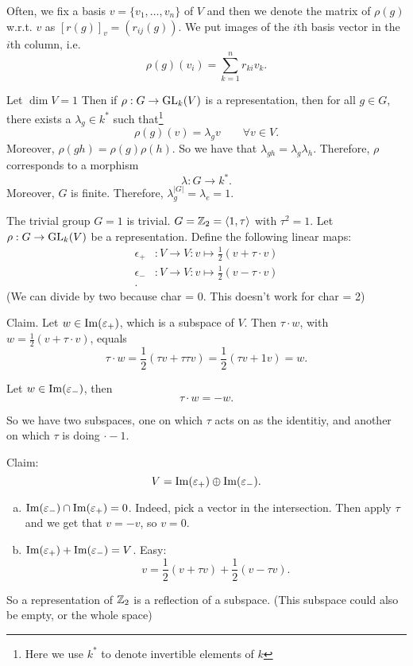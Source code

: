 Often, we fix a basis $ v = \{v_1, \ldots, v_n\}$ of $V $ and then we denote the matrix of $\rho(g)$ w.r.t. $v$ as $[r(g)]_v = (r_{ij}(g))$.
We put images of the $i$th basis vector in the $i$th column, i.e.
\[
    \rho(g)(v_i) = \sum_{k=1}^{n} r_{ki} v_k
.\] 

\begin{eg}
    Let $\dim V = 1$
    Then if $\rho: G\to \operatorname{GL}_k(V)$ is a representation, then for all $g \in G$, there exists a $\lambda_g \in k^{*}$ such that\footnote{Here we use $k^{*}$ to denote invertible elements of $k$}
    \[
        \rho(g)(v) = \lambda_g v \qquad \forall  v \in V
    .\] 
    Moreover, $\rho(gh) = \rho(g) \rho(h)$.
    So we have that  $\lambda_{gh} = \lambda_g \lambda_h.$
    Therefore, $\rho$ corresponds to a morphism
    \[
    \lambda: G \to  k^{*}
    .\] 
    Moreover, $G$ is finite. Therefore, $\lambda_g^{|G|} = \lambda_e = 1$.
\end{eg}

\begin{eg}
    The trivial group $G = 1$ is trivial.
    $G = \mathbb{Z}_2 = \left<1, \tau \right>$ with $\tau^2 = 1$.
    Let $\rho: G \to  \operatorname{GL}_k(V)$ be a representation.
    Define the following linear maps:
    \begin{align*}
        \epsilon_+&: V \to  V : v \mapsto  \frac{1}{2} (v + \tau\cdot v)\\
        \epsilon_-&: V \to  V : v \mapsto  \frac{1}{2} (v - \tau\cdot v)\\
    .\end{align*} 
    (We can divide by two because char = 0. This doesn't work for char = 2)

    Claim. Let $w \in  \operatorname{Im} (\varepsilon_+)$, which is a subspace of $V$.
    Then $\tau\cdot w$, with $w = \frac{1}{2}(v + \tau\cdot v)$, equals 
    \[
        \tau\cdot w = \frac{1}{2}(\tau v + \tau \tau v) = 
        \frac{1}{2}(\tau v + 1 v)  = w
    .\] 

    Let $w \in  \operatorname{Im} (\varepsilon_-)$, then
    \[
    \tau\cdot w = - w
    .\]

    So we have two subspaces, one on which $\tau$ acts on as the identitiy, and another on which $\tau$ is doing $\cdot -1$.

    Claim:
    \[
        V = \operatorname{Im} (\varepsilon_+)  \oplus \operatorname{Im}(\varepsilon_-)
    .\] 

    \begin{enumerate}[(a)]
        \item $\operatorname{Im}(\varepsilon_-) \cap \operatorname{Im}(\varepsilon_+) = 0$. Indeed, pick a vector in the intersection. Then apply $\tau$ and we get that $v = -v$, so  $v = 0$.
        \item  $\operatorname{Im}(\varepsilon_+) + \operatorname{Im}(\varepsilon_-) = V$. Easy:
             \[
                 v = \frac{1}{2} (v + \tau v) + \frac{1}{2}(v - \tau v)
            .\] 
    \end{enumerate}

    So a representation of $\mathbb{Z}_2$ is a reflection of a subspace. (This subspace could also be empty, or the whole space)
\end{eg}


